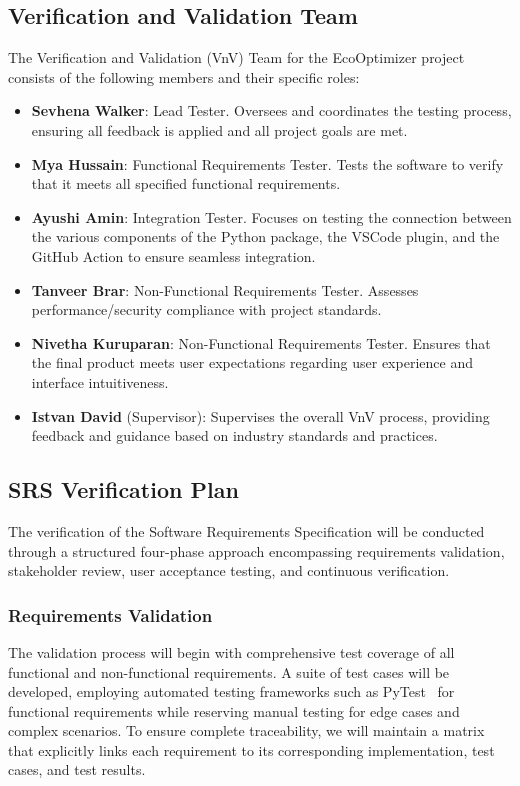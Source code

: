 \documentclass[12pt, titlepage]{article}
\begin{document}
\subsection{Verification and Validation Team}

The Verification and Validation (VnV) Team for the EcoOptimizer project consists of the following members and their specific roles:

\begin{itemize}
  \item \textbf{Sevhena Walker}: Lead Tester. Oversees and
    coordinates the testing process, ensuring all feedback is applied
    and all project goals are met.
  \item \textbf{Mya Hussain}: Functional Requirements Tester. Tests
    the software to verify that it meets all specified functional requirements.
  \item \textbf{Ayushi Amin}: Integration Tester. Focuses on testing
    the connection between the various components of the Python
    package, the VSCode plugin, and the GitHub Action to ensure
    seamless integration.
  \item \textbf{Tanveer Brar}: Non-Functional Requirements Tester.
    Assesses performance/security compliance with project standards.
  \item \textbf{Nivetha Kuruparan}: Non-Functional Requirements
    Tester. Ensures that the final product meets user expectations
    regarding user experience and interface intuitiveness.
  \item \textbf{Istvan David} (Supervisor): Supervises the overall
    VnV process, providing feedback and guidance based on industry
    standards and practices.
\end{itemize}

\subsection{SRS Verification Plan}

The verification of the Software Requirements Specification will be conducted through a structured four-phase approach encompassing requirements validation, stakeholder review, user acceptance testing, and continuous verification.

\subsubsection{Requirements Validation}
The validation process will begin with comprehensive test coverage of all functional and non-functional requirements. A suite of test cases will be developed, employing automated testing frameworks such as PyTest~\cite{pytest} for functional requirements while reserving manual testing for edge cases and complex scenarios. To ensure complete traceability, we will maintain a matrix that explicitly links each requirement to its corresponding implementation, test cases, and test results.
\end{document}
